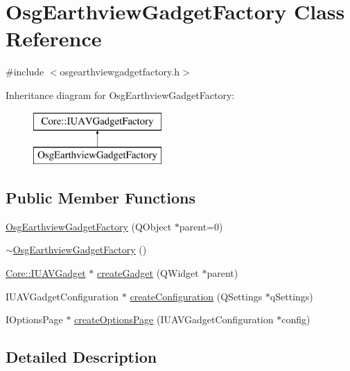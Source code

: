 \hypertarget{class_osg_earthview_gadget_factory}{\section{\-Osg\-Earthview\-Gadget\-Factory \-Class \-Reference}
\label{class_osg_earthview_gadget_factory}
}


{\ttfamily \#include $<$osgearthviewgadgetfactory.\-h$>$}

\-Inheritance diagram for \-Osg\-Earthview\-Gadget\-Factory\-:\begin{figure}[H]
\begin{center}
\leavevmode
\includegraphics[height=2.000000cm]{class_osg_earthview_gadget_factory}
\end{center}
\end{figure}
\subsection*{\-Public \-Member \-Functions}
\begin{DoxyCompactItemize}
\item 
\hyperlink{group___o_s_g_earth_view_pluging_ga80b08d5dc72dc33d68fb003039d09e79}{\-Osg\-Earthview\-Gadget\-Factory} (\-Q\-Object $\ast$parent=0)
\item 
\hyperlink{group___o_s_g_earth_view_pluging_ga3287ca5ea93e70d691a0f8f3ed84e4c9}{$\sim$\-Osg\-Earthview\-Gadget\-Factory} ()
\item 
\hyperlink{class_core_1_1_i_u_a_v_gadget}{\-Core\-::\-I\-U\-A\-V\-Gadget} $\ast$ \hyperlink{group___o_s_g_earth_view_pluging_gaf6044184a496af6c6c7c50c271a6ceef}{create\-Gadget} (\-Q\-Widget $\ast$parent)
\item 
\-I\-U\-A\-V\-Gadget\-Configuration $\ast$ \hyperlink{group___o_s_g_earth_view_pluging_ga863730abedc7eb805c2f5f9201aadfdc}{create\-Configuration} (\-Q\-Settings $\ast$q\-Settings)
\item 
\-I\-Options\-Page $\ast$ \hyperlink{group___o_s_g_earth_view_pluging_ga809eda563b3d5d297fc14507d28a122d}{create\-Options\-Page} (\-I\-U\-A\-V\-Gadget\-Configuration $\ast$config)
\end{DoxyCompactItemize}


\subsection{\-Detailed \-Description}


